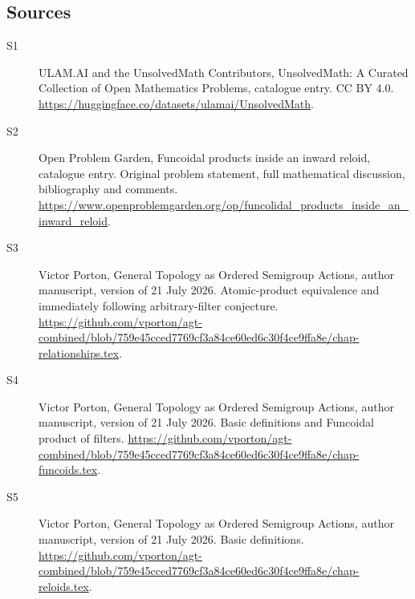 \documentclass[11pt]{article}
\begin{document}
\subsection{Sources}
\begin{description}
\item[\hypertarget{source:statement:1}{S1}] ULAM.AI and the UnsolvedMath Contributors, UnsolvedMath: A Curated Collection of Open Mathematics Problems, catalogue entry. CC BY 4.0. \url{https://huggingface.co/datasets/ulamai/UnsolvedMath}.
\item[\hypertarget{source:statement:2}{S2}] Open Problem Garden, Funcoidal products inside an inward reloid, catalogue entry. Original problem statement, full mathematical discussion, bibliography and comments. \url{https://www.openproblemgarden.org/op/funcolidal_products_inside_an_inward_reloid}.
\item[\hypertarget{source:statement:3}{S3}] Victor Porton, General Topology as Ordered Semigroup Actions, author manuscript, version of 21 July 2026. Atomic-product equivalence and immediately following arbitrary-filter conjecture. \url{https://github.com/vporton/agt-combined/blob/759e45cced7769cf3a84ce60ed6c30f4ce9ffa8e/chap-relationships.tex}.
\item[\hypertarget{source:statement:4}{S4}] Victor Porton, General Topology as Ordered Semigroup Actions, author manuscript, version of 21 July 2026. Basic definitions and Funcoidal product of filters. \url{https://github.com/vporton/agt-combined/blob/759e45cced7769cf3a84ce60ed6c30f4ce9ffa8e/chap-funcoids.tex}.
\item[\hypertarget{source:statement:5}{S5}] Victor Porton, General Topology as Ordered Semigroup Actions, author manuscript, version of 21 July 2026. Basic definitions. \url{https://github.com/vporton/agt-combined/blob/759e45cced7769cf3a84ce60ed6c30f4ce9ffa8e/chap-reloids.tex}.
\end{description}
\label{end:statement}
\end{document}
